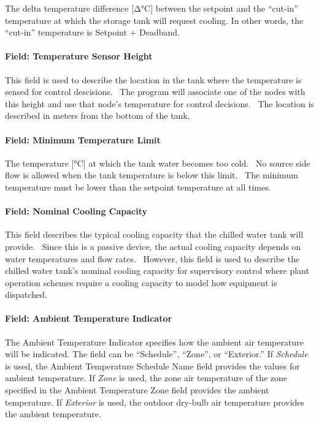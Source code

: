The delta temperature difference {[}Δ°C{]} between the setpoint and the ``cut-in'' temperature at which the storage tank will request cooling. In other words, the ``cut-in'' temperature is Setpoint + Deadband.

\paragraph{Field: Temperature Sensor Height}\label{field-temperature-sensor-height}

This field is used to describe the location in the tank where the temperature is sensed for control descisions.~ The program will associate one of the nodes with this height and use that node's temperature for control decisions.~ The location is described in meters from the bottom of the tank.

\paragraph{Field: Minimum Temperature Limit}\label{field-minimum-temperature-limit-1}

The temperature {[}°C{]} at which the tank water becomes too cold.~ No source side flow is allowed when the tank temperature is below this limit.~ The minimum temperature must be lower than the setpoint temperature at all times.

\paragraph{Field: Nominal Cooling Capacity}\label{field-nominal-cooling-capacity-3}

This field describes the typical cooling capacity that the chilled water tank will provide.~ Since this is a passive device, the actual cooling capacity depends on water temperatures and flow rates.~ However, this field is used to describe the chilled water tank's nominal cooling capacity for supervisory control where plant operation schemes require a cooling capacity to model how equipment is dispatched.

\paragraph{Field: Ambient Temperature Indicator}\label{field-ambient-temperature-indicator-1}

The Ambient Temperature Indicator specifies how the ambient air temperature will be indicated. The field can be ``Schedule'', ``Zone'', or ``Exterior.'' If \emph{Schedule} is used, the Ambient Temperature Schedule Name field provides the values for ambient temperature. If \emph{Zone} is used, the zone air temperature of the zone specified in the Ambient Temperature Zone field provides the ambient temperature. If \emph{Exterior} is used, the outdoor dry-bulb air temperature provides the ambient temperature.

